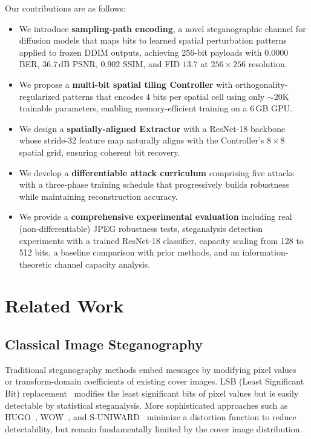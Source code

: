 \documentclass[conference]{IEEEtran}
\begin{document}
Our contributions are as follows:
\begin{itemize}[itemsep=2pt, topsep=2pt]
    \item We introduce \textbf{sampling-path encoding}, a novel steganographic channel for diffusion models that maps bits to learned spatial perturbation patterns applied to frozen DDIM outputs, achieving 256-bit payloads with $0.0000$ BER, $36.7$\,dB PSNR, $0.902$ SSIM, and FID $13.7$ at $256\times256$ resolution.

    \item We propose a \textbf{multi-bit spatial tiling Controller} with orthogonality-regularized patterns that encodes 4 bits per spatial cell using only $\sim$20K trainable parameters, enabling memory-efficient training on a 6\,GB GPU.

    \item We design a \textbf{spatially-aligned Extractor} with a ResNet-18 backbone whose stride-32 feature map naturally aligns with the Controller's $8\times8$ spatial grid, ensuring coherent bit recovery.

    \item We develop a \textbf{differentiable attack curriculum} comprising five attacks with a three-phase training schedule that progressively builds robustness while maintaining reconstruction accuracy.

    \item We provide a \textbf{comprehensive experimental evaluation} including real (non-differentiable) JPEG robustness tests, steganalysis detection experiments with a trained ResNet-18 classifier, capacity scaling from 128 to 512 bits, a baseline comparison with prior methods, and an information-theoretic channel capacity analysis.
\end{itemize}


\section{Related Work}
\label{sec:related}

\subsection{Classical Image Steganography}

Traditional steganography methods embed messages by modifying pixel values~\cite{cox2007digital} or transform-domain coefficients of existing cover images.
LSB (Least Significant Bit) replacement~\cite{chan2004hiding} modifies the least significant bits of pixel values but is easily detectable by statistical steganalysis.
More sophisticated approaches such as HUGO~\cite{pevny2010using}, WOW~\cite{holub2012designing}, and S-UNIWARD~\cite{holub2014universal} minimize a distortion function to reduce detectability, but remain fundamentally limited by the cover image distribution.
\end{document}

